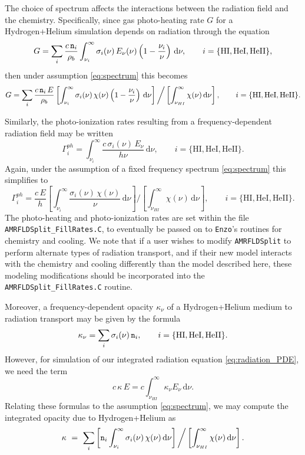\documentclass[letterpaper,10pt]{article}
\renewcommand{\(}{\left(}
\renewcommand{\)}{\right)}
\newcommand{\rhob}{\rho_b}
\newcommand{\mn}{{\tt n}}
\begin{document}
The choice of spectrum affects the interactions between the radiation
field and the chemistry.  Specifically, since gas photo-heating
rate $G$ for a Hydrogen+Helium simulation depends on radiation through
the equation 
\[
  G = \sum_{i} \frac{c\,\mn_{i}}{\rhob}
    \int_{\nu_{i}}^{\infty} \sigma_{i}(\nu)\, E_{\nu}(\nu)
    \left(1-\frac{\nu_{i}}{\nu}\right)\, \mathrm{d}\nu, 
    \qquad i = \{\text{HI}, \text{HeI}, \text{HeII}\},
\]
then under assumption \eqref{eq:spectrum} this becomes
\begin{equation}
  \label{eq:G_nLTE}
  G = \sum_{i} \frac{c\,\mn_{i}\,E}{\rhob} 
    \left[\int_{\nu_i}^{\infty} \sigma_i(\nu)\, \chi(\nu)
    \left(1-\frac{\nu_i}{\nu}\right)\, \mathrm{d}\nu\right] \bigg/
    \left[\int_{\nu_{HI}}^{\infty} \chi(\nu)\, \mathrm{d}\nu\right],
    \qquad i = \{\text{HI}, \text{HeI}, \text{HeII}\}.
\end{equation}

Similarly, the photo-ionization rates resulting from a
frequency-dependent radiation field may be written
\[
  \Gamma_i^{ph} = \int_{\nu_{i}}^{\infty} \frac{c\, \sigma_{i}(\nu)\,
    E_{\nu}}{h\nu}\, \mathrm{d}\nu,
    \qquad i = \{\text{HI}, \text{HeI}, \text{HeII}\}.
\]
Again, under the assumption of a fixed frequency spectrum
\eqref{eq:spectrum} this simplifies to
\begin{equation}
\label{eq:Gamma}
  \Gamma_i^{ph} = \frac{c\,E}{h}
  \left[\int_{\nu_{i}}^{\infty} \frac{\sigma_{i}(\nu)\,\chi(\nu)}{\nu}\,
    \mathrm{d}\nu\right] \bigg/
    \left[\int_{\nu_{HI}}^{\infty} \chi(\nu)\, \mathrm{d}\nu\right],
    \qquad i = \{\text{HI}, \text{HeI}, \text{HeII}\}.
\end{equation}
The photo-heating and photo-ionization rates are set within the file
{\tt AMRFLDSplit\_FillRates.C}, to eventually be passed on to 
{\tt Enzo}'s routines for chemistry and cooling.  We note that if a
user wishes to modify {\tt AMRFLDSplit} to perform alternate types of
radiation transport, and if their new model interacts with the
chemistry and cooling differently than the model described here, these
modeling modifications should be incorporated into the {\tt
  AMRFLDSplit\_FillRates.C} routine.

Moreover, a frequency-dependent opacity $\kappa_{\nu}$ of a
Hydrogen+Helium medium to radiation transport may be given by the
formula
\[
  \kappa_{\nu} = \sum_i \sigma_i(\nu)\, \mn_i, 
  \qquad i = \{\text{HI}, \text{HeI}, \text{HeII}\}.
\]
However, for simulation of our integrated radiation equation
\eqref{eq:radiation_PDE}, we need the term
\[
   c\,\kappa\,E = c\int_{\nu_{HI}}^{\infty} \kappa_{\nu}
   E_{\nu}\,\mathrm{d}\nu.
\]
Relating these formulas to the assumption \eqref{eq:spectrum}, we
may compute the integrated opacity due to Hydrogen+Helium as
\begin{equation}
\label{eq:opacity}
  \kappa \ = \ \sum_i
  \left[\mn_{i} \int_{\nu_{i}}^{\infty}
    \sigma_{i}(\nu)\,\chi(\nu)\,\mathrm{d}\nu\right] \bigg/
  \left[\int_{\nu_{HI}}^{\infty} \chi(\nu)\,\mathrm{d}\nu\right].
\end{equation}
\end{document}
